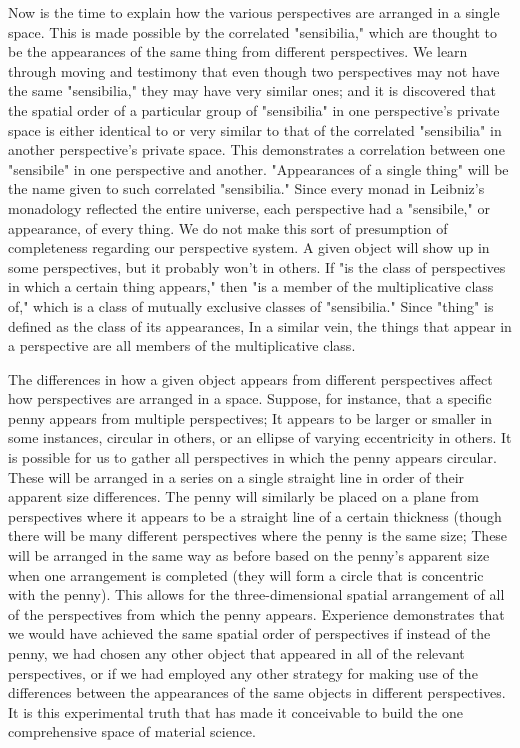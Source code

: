 \documentclass[a4paper,12pt]{book}[2004/02/16]
\theoremstyle{ilemma}
\theoremstyle{itheorem}
\theoremstyle{iother}
\theoremstyle{icorollary}
\theoremstyle{numcorollary}
\theoremstyle{idefinition}
\begin{document}
Now is the time to explain how the various perspectives are arranged in a single space. This is made possible by the correlated "sensibilia," which are thought to be the appearances of the same thing from different perspectives. We learn through moving and testimony that even though two perspectives may not have the same "sensibilia," they may have very similar ones; and it is discovered that the spatial order of a particular group of "sensibilia" in one perspective's private space is either identical to or very similar to that of the correlated "sensibilia" in another perspective's private space. This demonstrates a correlation between one "sensibile" in one perspective and another. "Appearances of a single thing" will be the name given to such correlated "sensibilia." Since every monad in Leibniz's monadology reflected the entire universe, each perspective had a "sensibile," or appearance, of every thing.
We do not make this sort of presumption of completeness regarding our perspective system. A given object will show up in some perspectives, but it probably won't in others. If "is the class of perspectives in which a certain thing appears," then "is a member of the multiplicative class of," which is a class of mutually exclusive classes of "sensibilia." Since "thing" is defined as the class of its appearances, In a similar vein, the things that appear in a perspective are all members of the multiplicative class.

The differences in how a given object appears from different perspectives affect how perspectives are arranged in a space. Suppose, for instance, that a specific penny appears from multiple perspectives; It appears to be larger or smaller in some instances, circular in others, or an ellipse of varying eccentricity in others. It is possible for us to gather all perspectives in which the penny appears circular. These will be arranged in a series on a single straight line in order of their apparent size differences. The penny will similarly be placed on a plane from perspectives where it appears to be a straight line of a certain thickness (though there will be many different perspectives where the penny is the same size; These will be arranged in the same way as before based on the penny's apparent size when one arrangement is completed (they will form a circle that is concentric with the penny). This allows for the three-dimensional spatial arrangement of all of the perspectives from which the penny appears. Experience demonstrates that we would have achieved the same spatial order of perspectives if instead of the penny, we had chosen any other object that appeared in all of the relevant perspectives, or if we had employed any other strategy for making use of the differences between the appearances of the same objects in different perspectives. It is this experimental truth that has made it conceivable to
build the one comprehensive space of material science.
\end{document}
